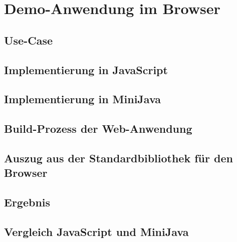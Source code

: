 \chapter{Demo-Anwendung im Browser}

\section{Use-Case}

\section{Implementierung in JavaScript}

\section{Implementierung in MiniJava}

\section{Build-Prozess der Web-Anwendung}

\section{Auszug aus der Standardbibliothek für den Browser}

\section{Ergebnis}

\section{Vergleich JavaScript und MiniJava}
